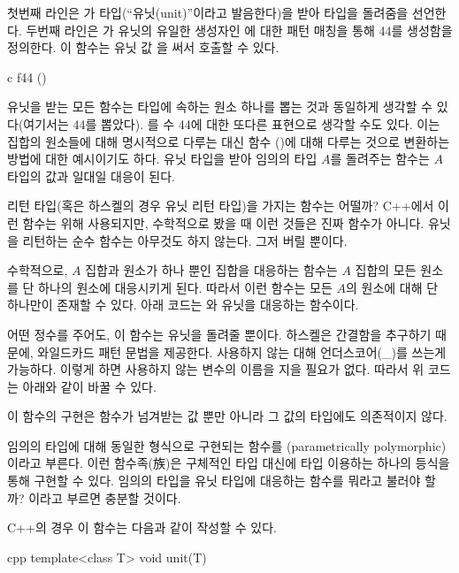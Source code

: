 첫번째 라인은 가 \code{()} 타입(``유닛(unit)''이라고 발음한다)을 받아  타입을 돌려줌을 선언한다.
두번째 라인은 가 유닛의 유일한 생성자인 \code{()}에 대한 패턴 매칭을 통해 44를 생성함을 정의한다. 이 함수는 유닛 값 \code{()}을 써서 호출할 수 있다.

\begin{snip}{c}
f44 ()
\end{snip}

유닛을 받는 모든 함수는 \trTarget 타입에 속하는 원소 하나를 뽑는 것과 동일하게 생각할 수 있다(여기서는  44를 뽑았다).
를 수 44에 대한 또다른 표현으로 생각할 수도 있다. 이는 집합의 원소들에 대해 명시적으로 다루는 대신 함수 (\trArrow)에 대해 다루는 것으로 변환하는 방법에 대한 예시이기도 하다.
유닛 타입을 받아 임의의 타입 $A$를 돌려주는 함수는 $A$ 타입의 값과 일대일 대응이 된다.

 리턴 타입(혹은 하스켈의 경우 유닛 리턴 타입)을 가지는 함수는 어떨까?
C++에서 이런 함수는 \trSideEffect\를 위해 사용되지만, 수학적으로 봤을 때 이런 것들은 진짜 함수가 아니다.
유닛을 리턴하는 순수 함수는 아무것도 하지 않는다. 그저 \trArgument\를 버릴 뿐이다.

수학적으로, $A$ 집합과 원소가 하나 뿐인 집합을 대응하는 함수는 $A$ 집합의 모든 원소를 단 하나의 원소에 대응시키게 된다.
따라서 이런 함수는 모든 $A$의 원소에 대해 단 하나만이 존재할 수 있다. 아래 코드는 와 유닛을 대응하는 함수이다.

어떤 정수를 주어도, 이 함수는 유닛을 돌려줄 뿐이다. 하스켈은 간결함을 추구하기 때문에, 와일드카드 패턴 문법을 제공한다. 사용하지 않는  대해 언더스코어(\_)를 쓰는게 가능하다.
이렇게 하면 사용하지 않는 변수의 이름을 지을 필요가 없다. 따라서 위 코드는 아래와 같이 바꿀 수 있다.

이 함수의 구현은 함수가 넘겨받는 값 뿐만 아니라 그 값의 타입에도 의존적이지 않다.

임의의 타입에 대해 동일한 형식으로 구현되는 함수를 \trParameter\trPolymorphic(parametrically polymorphic)이라고 부른다.
이런 함수족(族)은 구체적인 타입 대신에 타입  이용하는 하나의 등식을 통해 구현할 수 있다.
임의의 타입을 유닛 타입에 대응하는 \trPolymorphic 함수를 뭐라고 불러야 할까?  이라고 부르면 충분할 것이다.


C++의 경우 이 함수는 다음과 같이 작성할 수 있다.

\begin{snip}{cpp}
template<class T>
void unit(T) {}
\end{snip}

